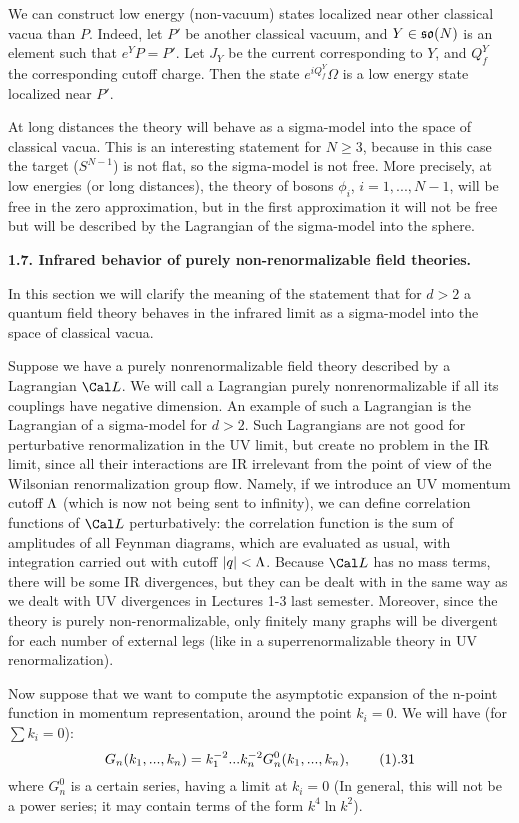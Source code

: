 We can construct low energy (non-vacuum) states 
localized near other classical vacua than $P$. Indeed, let $P'$ be
another classical vacuum, and $Y\in \frak{so}(N)$ is 
an element such that $e^YP=P'$. Let $J_Y$ be the current 
corresponding to $Y$, and $Q^Y_f$ the corresponding cutoff charge.  
Then the state $e^{iQ^Y_f}\Omega$ is a low energy state 
localized near $P'$. 

At long distances the theory will behave 
as a sigma-model into the space of classical vacua. 
This is an interesting statement for $N\ge 3$, because in this case 
the target ($S^{N-1}$) is not flat, so the sigma-model is not free. 
More precisely, at low energies (or long distances), the theory 
of bosons $\phi_i$, $i=1,...,N-1$, will be free in the zero approximation, 
but in the first approximation it will not be free but will be described
by the Lagrangian of the sigma-model into the sphere. 

{\bf 1.7. Infrared behavior of purely non-renormalizable field theories.}

In this section we will clarify the meaning of
the statement that for $d>2$ a quantum field theory behaves in the infrared 
limit as a sigma-model into the space of classical vacua.

Suppose we have a purely nonrenormalizable field theory 
described by a Lagrangian $\Cal L$. We will call a Lagrangian 
purely nonrenormalizable if all its couplings have negative dimension.
An example of such a Lagrangian is the Lagrangian of a sigma-model for 
$d>2$. Such Lagrangians are not good for perturbative renormalization 
in the UV limit, but create no problem in the IR limit, since
all their interactions are IR irrelevant from the point of view of 
the Wilsonian renormalization group flow. Namely, if 
we introduce an UV momentum cutoff $\Lambda$ (which is now not being sent 
to infinity), we can define correlation functions of $\Cal L$ 
perturbatively: the correlation function
is the sum of amplitudes of all Feynman diagrams, 
which are evaluated as usual, with integration carried out
with cutoff $|q|<\Lambda$. Because $\Cal L$ has no mass terms, 
there will be some IR divergences, but they can be dealt 
with in the same way as we dealt with UV divergences 
in Lectures 1-3 last semester. Moreover, since the theory is purely 
non-renormalizable, only finitely many graphs will be divergent
for each number of external legs (like in a superrenormalizable 
theory in UV renormalization). 

Now suppose that we want to compute the asymptotic expansion  
of the n-point function in momentum representation, around 
the point $k_i=0$. 
We will have (for $\sum k_i=0$):
$$
G_n(k_1,...,k_n)=k_1^{-2}...k_n^{-2}G_n^0(k_1,...,k_n),\tag 1.31
$$
where $G_n^0$ is a certain series, having a limit at $k_i=0$ 
(In general, this will not be a power series; it may contain terms 
of the form $k^4\ln k^2$). 

